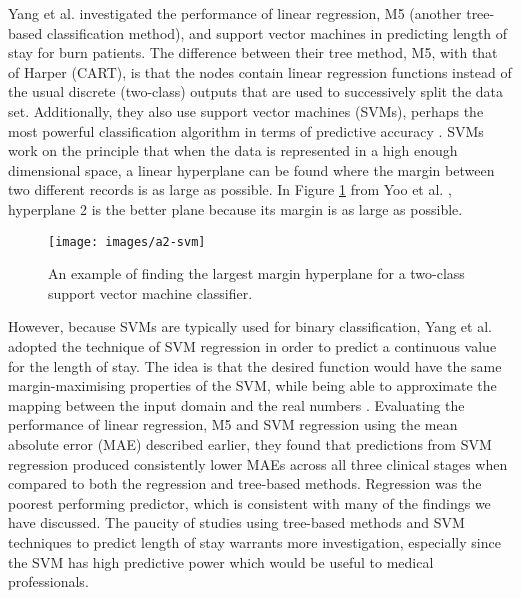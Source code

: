 Yang et al. investigated the performance of linear regression, M5 (another
tree-based classification method), and support vector machines in predicting
length of stay for burn patients. The difference between their tree method,
M5, with that of Harper (CART), is that the nodes contain linear regression
functions instead of the usual discrete (two-class) outputs that are used to
successively split the data set. Additionally, they also use support vector
machines (SVMs), perhaps the most powerful classification algorithm in terms of
predictive accuracy \citep{Bellazzi2008}. SVMs work on the principle that when
the data is represented in a high enough dimensional space, a linear hyperplane
can be found where the margin between two different records is as large as
possible. In Figure \ref{fig:svm-example} from Yoo et al. \citep{Yoo2012},
hyperplane 2 is the better plane because its margin is as large as possible. 
\begin{figure}[h]
\caption{An example of finding the largest margin hyperplane for a two-class
support vector machine classifier.}
\label{fig:svm-example}
\centering
\texttt{[image: images/a2-svm]}
\end{figure}

However, because SVMs are typically
used for binary classification, Yang et al. adopted the technique of SVM
regression in order to predict a continuous value for the length of stay. The
idea is that the desired function would have the same margin-maximising
properties of the SVM, while being able to approximate the mapping between the
input domain and the real numbers \citep{Yang2010}. Evaluating the performance
of linear regression, M5 and SVM regression using the mean absolute error
(MAE) described earlier, they found that predictions from SVM regression
produced consistently lower MAEs across all three clinical stages when compared
to both the regression and tree-based methods. Regression was the poorest
performing predictor, which is consistent with many of the findings we have
discussed. The paucity of studies using tree-based methods and SVM techniques
to predict length of stay warrants more investigation, especially since the
SVM has high predictive power which would be useful to medical professionals.

